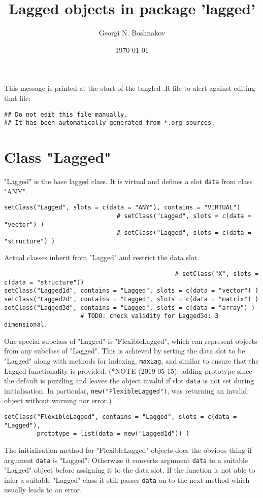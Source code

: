 \documentclass[11pt,a4paper]{article}
\author{Georgi N. Boshnakov}
\date{\today}
\title{Lagged objects in package 'lagged'}
\begin{document}
\maketitle
\tableofcontents

\vspace*{1cm}
This message is printed at the start of the tangled .R file to alert against editing that
file:
\begin{verbatim}
## Do not edit this file manually.
## It has been automatically generated from *.org sources.
\end{verbatim}



\section{Class "Lagged"}
\label{sec:orgfa847ad}


"Lagged" is the base lagged class. It is virtual and defines a slot \texttt{data} from class
"ANY".
\begin{verbatim}
setClass("Lagged", slots = c(data = "ANY"), contains = "VIRTUAL")
                               # setClass("Lagged", slots = c(data = "vector") )
                               # setClass("Lagged", slots = c(data = "structure") )
\end{verbatim}

Actual classes inherit from "Lagged" and restrict the data slot.  
\begin{verbatim}
                                               # setClass("X", slots = c(data = "structure"))
setClass("Lagged1d", contains = "Lagged", slots = c(data = "vector") )
setClass("Lagged2d", contains = "Lagged", slots = c(data = "matrix") )
setClass("Lagged3d", contains = "Lagged", slots = c(data = "array") )
                     # TODO: check validity for Lagged3d: 3 dimensional.
\end{verbatim}
One special subclass of "Lagged" is "FlexibleLagged", which can represent objects from any
subclass of "Lagged". This is achieved by setting the data slot to be "Lagged" along with
methods for indexing, \texttt{maxLag}, and similar to ensure that the Lagged functionality is
provided. (*NOTE (2019-05-15): adding prototype since the default is puzzling and leaves the
object invalid if slot \texttt{data} is not set during initialisation. In particular,
\texttt{new("FlexibleLagged")}, was returning an invalid object without warning nor error.)
\begin{verbatim}
setClass("FlexibleLagged", contains = "Lagged", slots = c(data = "Lagged"),
         prototype = list(data = new("Lagged1d")) )
\end{verbatim}
The initialisation method for "FlexibleLagged" objects does the obvious thing if argument
\texttt{data} is "Lagged". Otherwise it converts argument \texttt{data} to a suitable "Lagged" object
before assigning it to the data slot. If the function is not able to infer a suitable
"Lagged" class it still passes \texttt{data} on to the next method which usually leads to an error.
\end{document}
